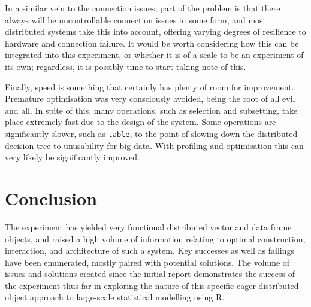 \documentclass[a4paper,10pt]{article}
\begin{document}
In a similar vein to the connection issues, part of the problem is that there
always will be uncontrollable connection issues in some form, and most
distributed systems take this into account, offering varying degrees of
resilience to hardware and connection failure.
It would be worth considering how this can be integrated into this experiment,
or whether it is of a scale to be an experiment of its own; regardless, it
is possibly time to start taking note of this.

Finally, speed is something that certainly has plenty of room for improvement.
Premature optimisation was very consciously avoided, being the root of all evil
and all.
In spite of this, many operations, such as selection and subsetting, take place
extremely fast due to the design of the system.
Some operations are significantly slower, such as \texttt{table}, to the point
of slowing down the distributed decision tree to unusability for big data.
With profiling and optimisation this can very likely be significantly improved.

\section{Conclusion}
The experiment has yielded very functional distributed vector and data frame
objects, and raised a high volume of information relating to optimal
construction, interaction, and architecture of such a system.
Key successes as well as failings have been enumerated, mostly paired with
potential solutions.
The volume of issues and solutions created since the initial report
demonstrates the success of the experiment thus far in exploring the nature of
this specific eager distributed object approach to large-scale statistical
modelling using R.

\printbibliography
\end{document}
